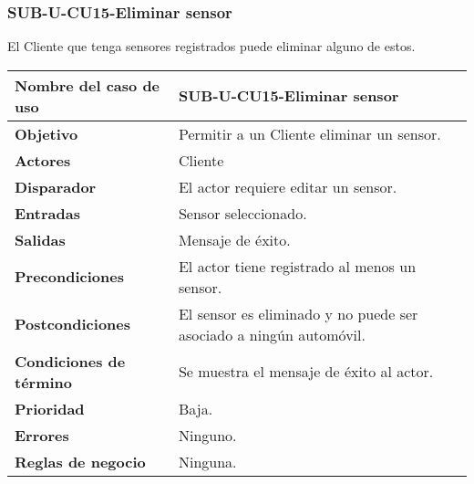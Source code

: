 \subsubsection{SUB-U-CU15-Eliminar sensor}\label{SUB-U-CU15}
El Cliente que tenga sensores registrados puede eliminar alguno de estos.

\begin{longtable}{|J{5cm}|J{10.3cm}|}
	\hline
	\textbf{Nombre del caso de uso} &
		SUB-U-CU15-Eliminar sensor \\ \hline
	\textbf{Objetivo} &
		Permitir a un Cliente eliminar un sensor. \\ \hline
	\textbf{Actores} &
		Cliente \\ \hline 
	\textbf{Disparador} & 
		El actor requiere editar un sensor. \\ \hline 
	\textbf{Entradas} & Sensor seleccionado.
		\\ \hline 
	\textbf{Salidas} & Mensaje de éxito.
		\\ \hline
	\textbf{Precondiciones} & El actor tiene registrado al menos un sensor.
		\\ \hline
	\textbf{Postcondiciones} & El sensor es eliminado y no puede ser asociado a ningún automóvil.
		\\ \hline
	\textbf{Condiciones de término} & Se muestra el mensaje de éxito al actor.
		\\ \hline 
	\textbf{Prioridad} & 
		Baja. \\ \hline
	\textbf{Errores} & Ninguno.
		\\ \hline
	\textbf{Reglas de negocio} & Ninguna.
		 \\ \hline
\end{longtable}

